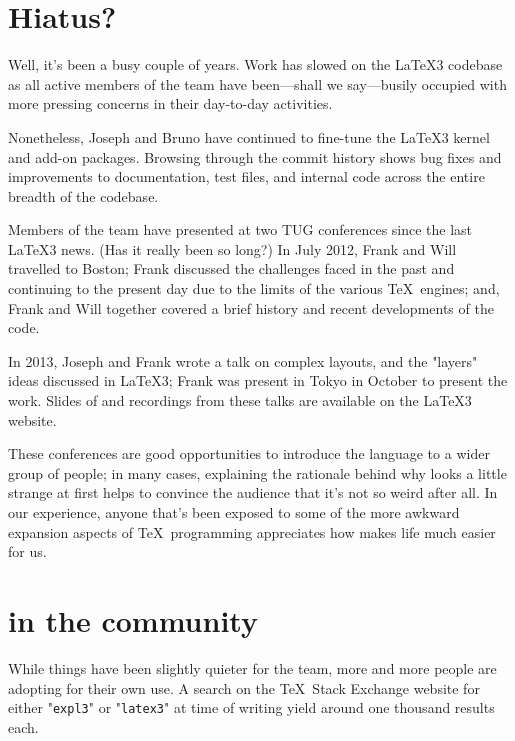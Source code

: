 \documentclass{ltnews}
\begin{document}
\maketitle

\raisefirstsection
\tableofcontents     %

\section{Hiatus?}

Well, it's been a busy couple of years.
Work has slowed on the \LaTeX3 codebase as all active members of the team have been---shall we say---busily occupied with more pressing concerns in their day-to-day activities.

Nonetheless, Joseph and Bruno have continued to fine-tune the \LaTeX3 kernel and add-on packages.
Browsing through the commit history shows bug fixes and improvements to documentation, test files, and internal code across the entire breadth of the codebase.

Members of the team have presented at two TUG conferences since the last \LaTeX3 news. (Has it really been so long?)
In July 2012, Frank and Will travelled to Boston; Frank discussed the challenges faced in the past and continuing to the present day due to the limits of the various \TeX\ engines; and, Frank and Will together covered a brief history and recent developments of the  code.

In 2013, Joseph and Frank wrote a talk on complex layouts, and the "layers" ideas discussed in \LaTeX3; Frank was present in Tokyo in October to present the work.
Slides of and recordings from these talks are available on the \LaTeX3 website.

These conferences are good opportunities to introduce the  language to a wider group of people; in many cases, explaining the rationale behind why  looks a little strange at first helps to convince the audience that it's not so weird after all.
In our experience, anyone that's been exposed to some of the more awkward expansion aspects of \TeX\ programming appreciates how  makes life much easier for us.

\section{ in the community}

While things have been slightly quieter for the team, more and more people are adopting  for their own use.
A search on the \TeX\ Stack Exchange website for either "\texttt{expl3}" or "\texttt{latex3}" at time of writing yield around one thousand results each.
\end{document}

